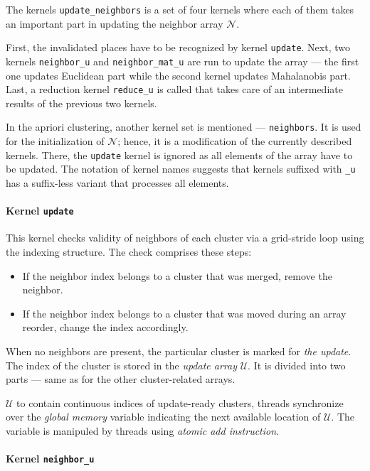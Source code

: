 The kernels \texttt{update\_neighbors} is a set of four kernels where each of them takes an important part in updating the neighbor array $\mathcal{N}$.

First, the invalidated places have to be recognized by kernel \texttt{update}. Next, two kernels \texttt{neighbor\_u} and \texttt{neighbor\_mat\_u} are run to update the array --- the first one updates Euclidean part while the second kernel updates Mahalanobis part. Last, a reduction kernel \texttt{reduce\_u} is called that takes care of an intermediate results of the previous two kernels.

In the apriori clustering, another kernel set is mentioned ---  \texttt{neighbors}. It is used for the initialization of $\mathcal{N}$; hence, it is a modification of the currently described kernels. There, the \texttt{update} kernel is ignored as all elements of the array have to be updated. The notation of kernel names suggests that kernels suffixed with \texttt{\_u} has a suffix-less variant that processes all elements.

\paragraph{Kernel \texttt{update}}
This kernel checks validity of neighbors of each cluster via a grid-stride loop using the indexing structure. The check comprises these steps:
\begin{itemize}
	\item If the neighbor index belongs to a cluster that was merged, remove the neighbor.
	\item If the neighbor index belongs to a cluster that was moved during an array reorder, change the index accordingly.
\end{itemize} 
When no neighbors are present, the particular cluster is marked for \emph{the update}. The index of the cluster is stored in the \emph{update array} $\mathcal{U}$. It is divided into two parts --- same as for the other cluster-related arrays. 

$\mathcal{U}$ to contain continuous indices of update-ready clusters, threads synchronize over the \emph{global memory} variable indicating the next available location of $\mathcal{U}$. The variable is manipuled by threads using \emph{atomic add instruction}.

\paragraph{Kernel \texttt{neighbor\_u}}

